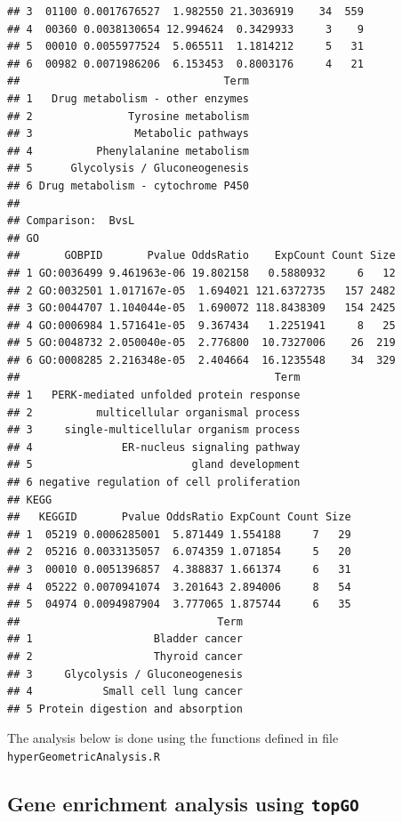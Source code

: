 \documentclass{article}\usepackage[]{graphicx}\usepackage[]{color}
\makeatletter
\newenvironment{kframe}{%
 \def\at@end@of@kframe{}%
 \ifinner\ifhmode%
  \def\at@end@of@kframe{\end{minipage}}%
  \begin{minipage}{\columnwidth}%
 \fi\fi%
 \def\FrameCommand##1{\hskip\@totalleftmargin \hskip-\fboxsep
 \colorbox{shadecolor}{##1}\hskip-\fboxsep
     \hskip-\linewidth \hskip-\@totalleftmargin \hskip\columnwidth}%
 \MakeFramed {\advance\hsize-\width
   \@totalleftmargin\z@ \linewidth\hsize
   \@setminipage}}%
 {\par\unskip\endMakeFramed%
 \at@end@of@kframe}
\newenvironment{knitrout}{}{} %
\makeatother
\begin{document}
\begin{knitrout}
\begin{kframe}
\begin{verbatim}
## 3  01100 0.0017676527  1.982550 21.3036919    34  559
## 4  00360 0.0038130654 12.994624  0.3429933     3    9
## 5  00010 0.0055977524  5.065511  1.1814212     5   31
## 6  00982 0.0071986206  6.153453  0.8003176     4   21
##                                Term
## 1   Drug metabolism - other enzymes
## 2               Tyrosine metabolism
## 3                Metabolic pathways
## 4          Phenylalanine metabolism
## 5      Glycolysis / Gluconeogenesis
## 6 Drug metabolism - cytochrome P450
## 
## Comparison:  BvsL 
## GO
##       GOBPID       Pvalue OddsRatio    ExpCount Count Size
## 1 GO:0036499 9.461963e-06 19.802158   0.5880932     6   12
## 2 GO:0032501 1.017167e-05  1.694021 121.6372735   157 2482
## 3 GO:0044707 1.104044e-05  1.690072 118.8438309   154 2425
## 4 GO:0006984 1.571641e-05  9.367434   1.2251941     8   25
## 5 GO:0048732 2.050040e-05  2.776800  10.7327006    26  219
## 6 GO:0008285 2.216348e-05  2.404664  16.1235548    34  329
##                                        Term
## 1   PERK-mediated unfolded protein response
## 2          multicellular organismal process
## 3     single-multicellular organism process
## 4              ER-nucleus signaling pathway
## 5                         gland development
## 6 negative regulation of cell proliferation
## KEGG
##   KEGGID       Pvalue OddsRatio ExpCount Count Size
## 1  05219 0.0006285001  5.871449 1.554188     7   29
## 2  05216 0.0033135057  6.074359 1.071854     5   20
## 3  00010 0.0051396857  4.388837 1.661374     6   31
## 4  05222 0.0070941074  3.201643 2.894006     8   54
## 5  04974 0.0094987904  3.777065 1.875744     6   35
##                               Term
## 1                   Bladder cancer
## 2                   Thyroid cancer
## 3     Glycolysis / Gluconeogenesis
## 4           Small cell lung cancer
## 5 Protein digestion and absorption
\end{verbatim}


{\ttfamily\noindent\bfseries\color{errorcolor}{\#\# Error in `*tmp*`[[i]]: subscript out of bounds}}\end{kframe}
\end{knitrout}

The analysis below is done using the functions defined in file \texttt{hyperGeometricAnalysis.R}



\subsection{Gene enrichment analysis using \texttt{topGO}}
\end{document}
